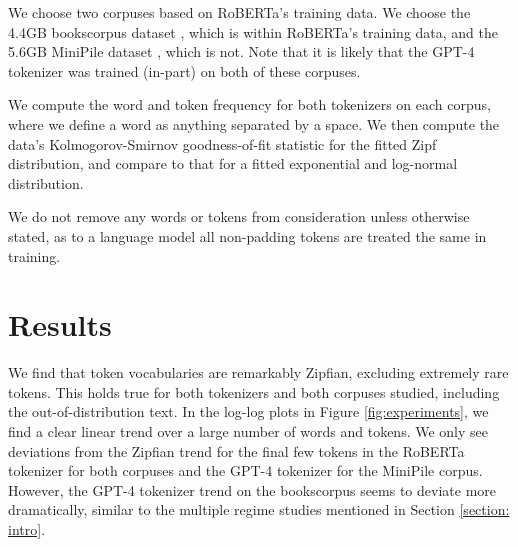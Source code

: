 \documentclass[11pt]{article}
\begin{document}
We choose two corpuses based on RoBERTa's training data. We choose the 4.4GB bookscorpus dataset \cite{zhu2015aligningbooksmoviesstorylike}, which is within RoBERTa's training data, and the 5.6GB MiniPile dataset \cite{kaddour2023minipilechallengedataefficientlanguage}, which is not. Note that it is likely that the GPT-4 tokenizer was trained (in-part) on both of these corpuses.

We compute the word and token frequency for both tokenizers on each corpus, where we define a word as anything separated by a space. We then compute the data's Kolmogorov-Smirnov goodness-of-fit statistic for the fitted Zipf distribution, and compare to that for a fitted exponential and log-normal distribution. 

We do not remove any words or tokens from consideration unless otherwise stated, as to a language model all non-padding tokens are treated the same in training. 

\section{Results}

We find that token vocabularies are remarkably Zipfian, excluding extremely rare tokens. This holds true for both tokenizers and both corpuses studied, including the out-of-distribution text. In the log-log plots in Figure \ref{fig:experiments}, we find a clear linear trend over a large number of words and tokens. We only see deviations from the Zipfian trend for the final few tokens in the RoBERTa tokenizer for both corpuses and the GPT-4 tokenizer for the MiniPile corpus. However, the GPT-4 tokenizer trend on the bookscorpus seems to deviate more dramatically, similar to the multiple regime studies mentioned in Section \ref{section: intro}.
\end{document}
